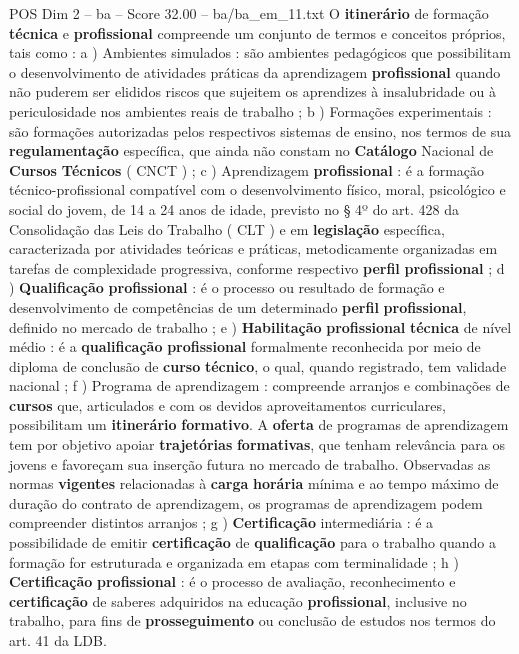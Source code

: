 \begin{textsample}{POS Dim 2 – ba – Score 32.00 – ba/ba\_em\_11.txt}
O \textbf{itinerário} de formação \textbf{técnica} e \textbf{profissional} compreende um conjunto de termos e conceitos próprios, tais como : a ) Ambientes simulados : são ambientes pedagógicos que possibilitam o desenvolvimento de atividades práticas da aprendizagem \textbf{profissional} quando não puderem ser elididos riscos que sujeitem os aprendizes à insalubridade ou à periculosidade nos ambientes reais de trabalho ; b ) Formações experimentais : são formações autorizadas pelos respectivos sistemas de ensino, nos termos de sua \textbf{regulamentação} específica, que ainda não constam no \textbf{Catálogo} Nacional de \textbf{Cursos} \textbf{Técnicos} ( CNCT ) ; c ) Aprendizagem \textbf{profissional} : é a formação técnico-profissional compatível com o desenvolvimento físico, moral, psicológico e social do jovem, de 14 a 24 anos de idade, previsto no § 4º do art. 428 da Consolidação das Leis do Trabalho ( CLT ) e em \textbf{legislação} específica, caracterizada por atividades teóricas e práticas, metodicamente organizadas em tarefas de complexidade progressiva, conforme respectivo \textbf{perfil} \textbf{profissional} ; d ) \textbf{Qualificação} \textbf{profissional} : é o processo ou resultado de formação e desenvolvimento de competências de um determinado \textbf{perfil} \textbf{profissional}, definido no mercado de trabalho ; e ) \textbf{Habilitação} \textbf{profissional} \textbf{técnica} de nível médio : é a \textbf{qualificação} \textbf{profissional} formalmente reconhecida por meio de diploma de conclusão de \textbf{curso} \textbf{técnico}, o qual, quando registrado, tem validade nacional ; f ) Programa de aprendizagem : compreende arranjos e combinações de \textbf{cursos} que, articulados e com os devidos aproveitamentos curriculares, possibilitam um \textbf{itinerário} \textbf{formativo}.
A \textbf{oferta} de programas de aprendizagem tem por objetivo apoiar \textbf{trajetórias} \textbf{formativas}, que tenham relevância para os jovens e favoreçam sua inserção futura no mercado de trabalho.
Observadas as normas \textbf{vigentes} relacionadas à \textbf{carga} \textbf{horária} mínima e ao tempo máximo de duração do contrato de aprendizagem, os programas de aprendizagem podem compreender distintos arranjos ; g ) \textbf{Certificação} intermediária : é a possibilidade de emitir \textbf{certificação} de \textbf{qualificação} para o trabalho quando a formação for estruturada e organizada em etapas com terminalidade ; h ) \textbf{Certificação} \textbf{profissional} : é o processo de avaliação, reconhecimento e \textbf{certificação} de saberes adquiridos na educação \textbf{profissional}, inclusive no trabalho, para fins de \textbf{prosseguimento} ou conclusão de estudos nos termos do art. 41 da LDB.

\end{textsample}
